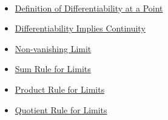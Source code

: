 \begin{remark*}[Dependencies]~\\
\begin{itemize}
  \item \hyperref[def:derivative-at-point]{Definition of Differentiability at a Point}
  \item \hyperref[thm:diff-implies-cont]{Differentiability Implies Continuity}
  \item \hyperref[thm:limit-nonvanishing]{Non-vanishing Limit}
  \item \hyperref[thm:limit-sum]{Sum Rule for Limits}
  \item \hyperref[thm:limit-product]{Product Rule for Limits}
  \item \hyperref[thm:limit-quotient]{Quotient Rule for Limits}
\end{itemize}
\end{remark*}